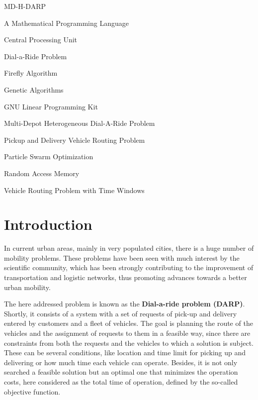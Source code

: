 \documentclass[tuberlin,cic,tc,openright,english,noabntcite,oneside]{iiufrgs}
\begin{document}
\begin{listofabbrv}{MD-H-DARP}
	\item[AMPL] A Mathematical Programming Language
	\item[CPU] Central Processing Unit
    \item[DARP] Dial-a-Ride Problem
    \item[FA] Firefly Algorithm
    \item[GA] Genetic Algorithms
    \item[GLPK] GNU Linear Programming Kit
    \item[MD-H-DARP] Multi-Depot Heterogeneous Dial-A-Ride Problem
    \item[PDVRP] Pickup and Delivery Vehicle Routing Problem
    \item[PSO] Particle Swarm Optimization
    \item[RAM] Random Access Memory
    \item[VRPTW] Vehicle Routing Problem with Time Windows
\end{listofabbrv}


\tableofcontents


\chapter{Introduction}
In current urban areas, mainly in very populated cities, there is a huge number of mobility problems. These problems have been seen with much interest by the scientific community, which has been strongly contributing to the improvement of transportation and logistic networks, thus promoting advances towards a better urban mobility.

The here addressed problem is known as the \textbf{Dial-a-ride problem (DARP)}. Shortly, it consists of a system with a set of requests of pick-up and delivery entered by customers and a fleet of vehicles. The goal is planning the route of the vehicles and the assignment of requests to them in a feasible way, since there are constraints from both the requests and the vehicles to which a solution is subject. These can be several conditions, like location and time limit for picking up and delivering or how much time each vehicle can operate. Besides, it is not only searched a feasible solution but an optimal one that minimizes the operation costs, here considered as the total time of operation, defined by the so-called objective function.
\end{document}
